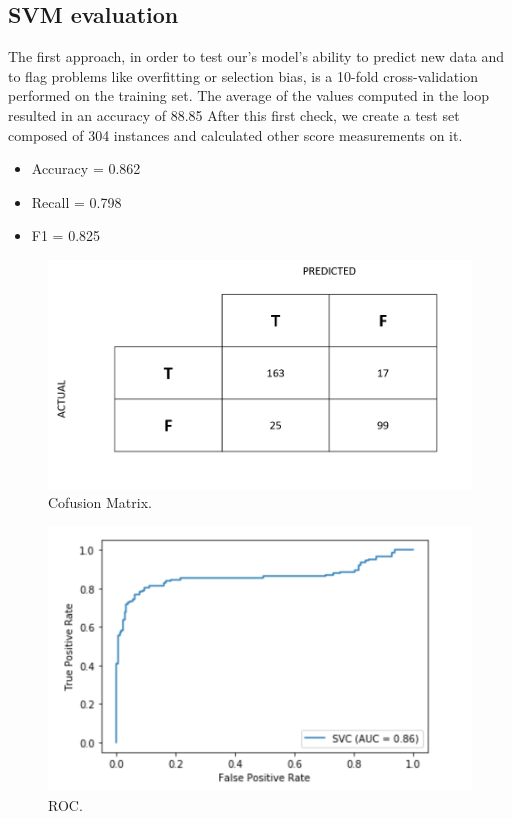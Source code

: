 \documentclass[conference]{IEEEtran}
\begin{document}
\subsection{SVM evaluation}
The first approach, in order to test our's model's ability to predict new data and to flag problems like overfitting or selection bias, is a 10-fold cross-validation performed on the training set.
The average of the values computed in the loop resulted in an accuracy of 88.85%
After this first check, we create a test set composed of 304 instances and calculated other score measurements on it.\\
\begin{itemize}
   \item  Accuracy = 0.862
\end{itemize}
\begin{itemize}
   \item  Recall = 0.798
\end{itemize}
\begin{itemize}
   \item  F1 = 0.825
\end{itemize}
\bigskip


\begin{figure}[htbp]
  \centering
  \includegraphics[width=0.8\columnwidth]{../svm_curves/confusion_matrix.png}
  \caption{Cofusion Matrix.}
  \label{fig:Cofusion Matrix}
\end{figure}

\bigskip


\begin{figure}[htbp]
  \centering
  \includegraphics[width=0.8\columnwidth]{../svm_curves/ROC_curve.png}
  \caption{ROC.}
  \label{fig:ROC_curve}
\end{figure}
\end{document}
